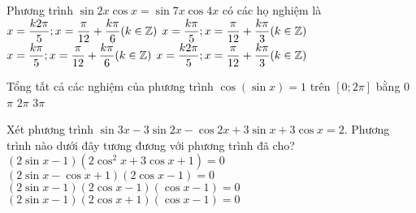 \begin{ex}%
Phương trình $\sin 2x \cos x = \sin 7x \cos 4x$ có các họ nghiệm là
\choice
{$x=\dfrac{k2\pi}{5};x=\dfrac{\pi}{12}+\dfrac{k\pi}{6} (k \in \Bbb{Z})$}
{$x=\dfrac{k\pi}{5};x=\dfrac{\pi}{12}+\dfrac{k\pi}{3} (k \in \Bbb{Z})$}
{\True $x=\dfrac{k\pi}{5};x=\dfrac{\pi}{12}+\dfrac{k\pi}{6} (k \in \Bbb{Z})$}
{$x=\dfrac{k2\pi}{5};x=\dfrac{\pi}{12}+\dfrac{k\pi}{3} (k \in \Bbb{Z})$}
\end{ex}
\begin{ex}%
Tổng tất cả các nghiệm của phương trình $ \cos (\sin x) = 1$ trên $[0;2\pi]$ bằng
\choice
{$0$}
{$\pi$}
{$2\pi$}
{\True $3\pi$}
\end{ex}
\begin{ex}%
Xét phương trình $\sin 3x -3 \sin 2x -\cos 2x +3\sin x +3\cos x = 2$. Phương trình nào dưới đây tương đương với phương trình đã cho?
\choice
{$(2\sin x- 1)(2\cos^2x + 3\cos x +1)=0$}
{$(2\sin x- \cos x +1)(2\cos x -1)=0$}
{$(2\sin x- 1)(2\cos x -1)(\cos x -1)=0$}
{\True $(2\sin x- 1)(2\cos x +1)(\cos x -1)=0$}
\end{ex}

